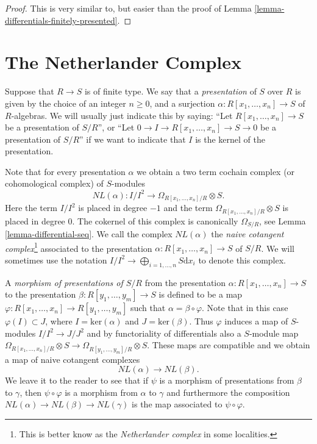 \begin{proof}
This is very similar to, but easier than the proof
of Lemma \ref{lemma-differentials-finitely-presented}.
\end{proof}









\section{The Netherlander Complex}
\label{section-netherlander}

\noindent
Suppose that $R \to S$ is of finite type.
We say that a {\it presentation} of $S$ over $R$ is
given by the choice of an integer $n \geq 0$, and
a surjection $\alpha : R[x_1, \ldots, x_n] \to S$
of $R$-algebras. We will usually just indicate
this by saying: ``Let $R[x_1, \ldots, x_n] \to S$ be a presentation of
$S/R$'', or ``Let $0\to I \to R[x_1, \ldots, x_n] \to S \to 0$
be a presentation of $S/R$'' if we want to indicate that $I$
is the kernel of the presentation.

\medskip\noindent
Note that for every presentation $\alpha$ we obtain a two term
cochain complex (or cohomological complex) of $S$-modules
$$
NL(\alpha) :
I/I^2 \longrightarrow \Omega_{R[x_1, \ldots, x_n]/R}\otimes S.
$$
Here the term $I/I^2$ is placed in degree $-1$ and
the term $\Omega_{R[x_1, \ldots, x_n]/R}\otimes S$ is
placed in degree $0$.
The cokernel of this complex is canonically $\Omega_{S/R}$,
see Lemma \ref{lemma-differential-seq}. We call the complex
$NL(\alpha)$
the {\it naive cotangent complex}\footnote{This is better know as the {\it
Netherlander complex} in some localities.} associated to the
presentation $\alpha : R[x_1, \ldots, x_n] \to S$ of $S/R$. We will
sometimes use the notation
$I/I^2 \to \bigoplus_{i = 1, \ldots, n} S\text{d}x_i$
to denote this complex.

\medskip\noindent
A {\it morphism of presentations of $S/R$} from the presentation
$\alpha : R[x_1, \ldots, x_n] \to S$ to the presentation
$\beta : R[y_1, \ldots, y_m] \to S$ is defined to be a
map $\varphi : R[x_1, \ldots, x_n] \to R[y_1, \ldots, y_m]$
such that $\alpha = \beta \circ \varphi$. Note that
in this case $\varphi(I) \subset J$, where $I = \text{ker}(\alpha)$
and $J = \text{ker}(\beta)$. Thus $\varphi$ induces a map
of $S$-modules $I/I^2 \to J/J^2$ and by functoriality of
differentials also a $S$-module map
$\Omega_{R[x_1, \ldots, x_n]/R}\otimes S
\to \Omega_{R[y_1, \ldots, y_m]/R}\otimes S$.
These maps are compatible and we obtain a map
of naive cotangent complexes
$$
NL(\alpha) \longrightarrow NL(\beta).
$$
We leave it to the reader to see that if $\psi$ is a morphism
of presentations from $\beta$ to $\gamma$, then $\psi \circ \varphi$
is a morphism from $\alpha$ to $\gamma$ and furthermore
the composition $NL(\alpha) \to NL(\beta) \to NL(\gamma)$
is the map associated to $\psi \circ \varphi$.

